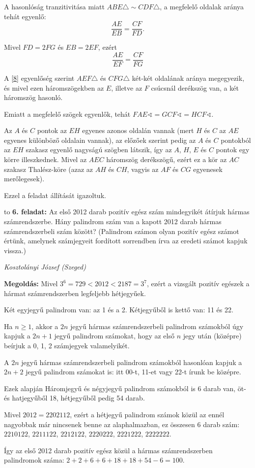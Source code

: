 \documentclass[a4paper,10pt]{article}
\newcommand{\ki}[2]{\hfill {\it #1 (#2)}\medskip}
\newcommand{\vonal}{\hbox to \hsize{\hskip2truecm\hrulefill\hskip2truecm}}
\begin{document}
A hasonlóság tranzitivitása miatt $ABE\triangle\sim CDF\triangle$, a megfelelő oldalak aránya tehát egyenlő:
\[\frac{AE}{EB}=\frac{CF}{FD}.\]

Mivel $FD=2FG$ és $EB=2EF$, ezért
\begin{equation}
\frac{AE}{EF}=\frac{CF}{FG}\label{8}
\end{equation}

A \eqref{8} egyenlőség szerint $AEF\triangle$ és $CFG\triangle$ két-két oldalának aránya megegyezik, és mivel ezen háromszögekben az $E$, illetve az $F$ csúcsnál derékszög van, a két háromszög hasonló.

Emiatt a megfelelő szögek egyenlők, tehát $FAE\sphericalangle=GCF\sphericalangle=HCF\sphericalangle$.

Az $A$ és $C$ pontok az $EH$ egyenes azonos oldalán vannak (mert $H$ és $C$ az $AE$ egyenes különböző oldalain vannak), az előzőek szerint pedig az $A$ és $C$ pontokból az $EH$ szakasz egyenlő nagyságú szögben látszik, így az $A$, $H$, $E$ és $C$ pontok egy körre illeszkednek. Mivel az $AEC$ háromszög derékszögű, ezért ez a kör az $AC$ szakasz Thalész-köre (azaz az $AH$ és $CH$, vagyis az $AF$ és $CG$ egyenesek merőlegesek).

Ezzel a feladat állítását igazoltuk.

\medskip

\vonal
{\bf 6. feladat: } Az első 2012 darab pozitív egész szám mindegyikét átírjuk hármas számrendszerbe. Hány palindrom szám van a kapott 2012 darab hármas számrendszerbeli szám között? (Palindrom számon
olyan pozitív egész számot értünk, amelynek számjegyeit fordított sorrendben írva az eredeti
számot kapjuk vissza.)

\ki{Kosztolányi József}{Szeged}\medskip

{\bf Megoldás: } Mivel $3^6=729<2012<2187=3^7$, ezért a vizsgált pozitív egészek a hármat számrendszerben legfeljebb hétjegyűek.

Két egyjegyű palindrom van: az 1 és a 2. Kétjegyűből is kettő van: 11 és 22.

Ha $n\ge1$, akkor a $2n$ jegyű hármas számrendszerbeli palindrom számokból úgy kapjuk a $2n+1$ jegyű palindrom számokat, hogy az első $n$ jegy után (középre) beírjuk a 0, 1, 2 számjegyek valamelyikét.

A $2n$ jegyű hármas számrendszerbeli palindrom számokból hasonlóan kapjuk a $2n+2$ jegyű palindrom számokat is: itt 00-t, 11-et vagy 22-t írunk be középre.

Ezek alapján Háromjegyű és négyjegyű palindrom számokból is 6 darab van, öt- és hatjegyűből 18, hétjegyűből pedig 54 darab.

Mivel $2012=2202112$, ezért a hétjegyű palindrom számok közül az ennél nagyobbak már nincsenek benne az alaphalmazban, ez összesen 6 darab szám: $2210122$, $2211122$, $2212122$, $2220222$, $2221222$, $2222222$.

Így az első 2012 darab pozitív egész közül a hármas számrendszerben palindromok száma: $2+2+6+6+18+18+54-6=100$.
\end{document}
